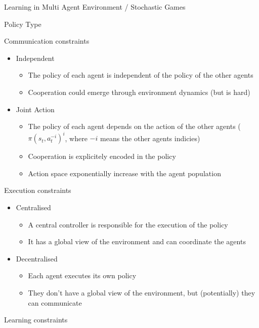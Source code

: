 \documentclass[presentation, 8pt]{beamer}\mode<presentation>{\usetheme{AMSBolognaFC}}
\begin{document}
\begin{frame}[allowframebreaks]{Learning in Multi Agent Environment / Stochastic Games}
\begin{exampleblock}{Policy Type}
\begin{itemize}
\begin{itemize}
	\end{itemize}
\end{itemize}
\end{exampleblock}
\begin{exampleblock}{Communication constraints}
\begin{itemize}
	\item Independent
	\begin{itemize}
		\item The policy of each agent is independent of the policy of the other agents
		\item Cooperation could emerge through environment dynamics (but is hard)
	\end{itemize}
	\item Joint Action
	\begin{itemize}
		\item The policy of each agent depends on the action of the other agents ($ \pi(s_t, a^{-i}_t)^i $, where $-i$ means the other agents indicies)
		\item Cooperation is explicitely encoded in the policy
		\item Action space exponentially increase with the agent population
	\end{itemize}
\end{itemize}
\end{exampleblock}
\begin{exampleblock}{Execution constraints}
\begin{itemize}
	\item Centralised
	\begin{itemize}
		\item A central controller is responsible for the execution of the policy
		\item It has a global view of the environment and can coordinate the agents
	\end{itemize}
	\item Decentralised
	\begin{itemize}
		\item Each agent executes its own policy
		\item They don't have a global view of the environment, but (potentially) they can communicate
	\end{itemize}
\end{itemize}
\end{exampleblock}
\begin{exampleblock}{Learning constraints}
\begin{itemize}

\end{itemize}
\end{exampleblock}
\end{frame}
\end{document}
